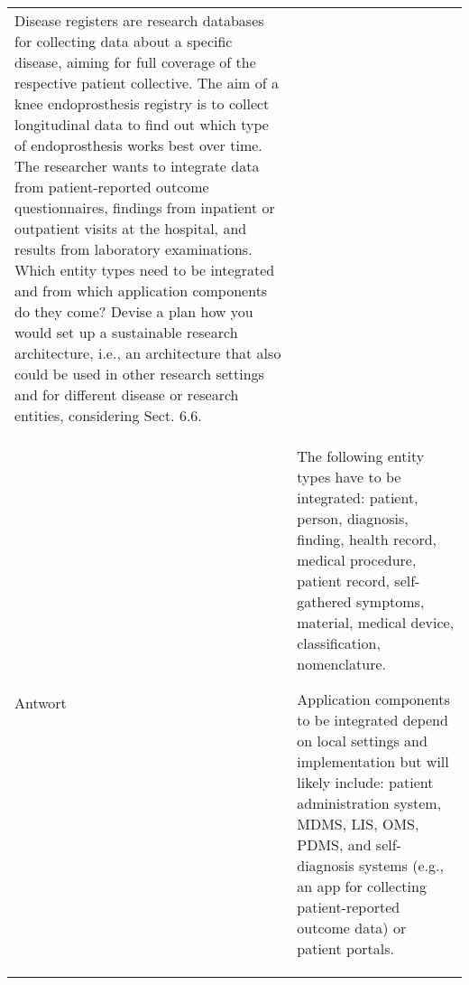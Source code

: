 {\begin{landscape}
\begin{longtable}{p{3cm}p{}}
    Disease registers are research databases for collecting data about a specific disease, aiming for full coverage of the respective patient collective.
    The aim of a knee endoprosthesis registry is to collect longitudinal data to find out which type of endoprosthesis works best over time.
    The researcher wants to integrate data from patient-reported outcome questionnaires, findings from inpatient or outpatient visits at the hospital, and results from laboratory examinations.
    Which entity types need to be integrated and from which application components do they come? Devise a plan how you would set up a sustainable research architecture, i.e., an architecture that also could be used in other research settings and for different disease or research entities, considering Sect. 6.6. \\
    Antwort & The following entity types have to be integrated: patient, person, diagnosis, finding, health record, medical procedure, patient record, self-gathered symptoms, material, medical device, classification, nomenclature.

    Application components to be integrated depend on local settings and implementation but will likely include: patient administration system, MDMS, LIS, OMS, PDMS, and self-diagnosis systems (e.g., an app for collecting patient-reported outcome data) or patient portals.


\end{longtable}
\end{landscape}}
